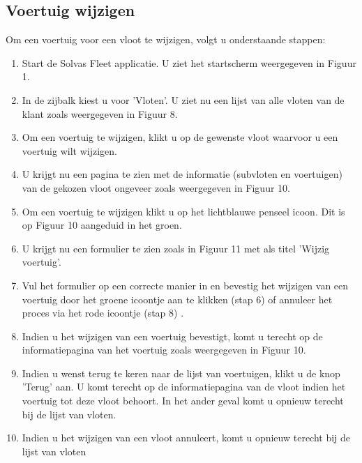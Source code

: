 \documentclass[11pt,openany]{article}
\begin{document}
\subsection{Voertuig wijzigen}
Om een voertuig voor een vloot te wijzigen, volgt u onderstaande stappen:
\begin{enumerate}
	\item Start de Solvas Fleet applicatie. U ziet het startscherm weergegeven in Figuur 1.
	\item In de zijbalk kiest u voor 'Vloten'. U ziet nu een lijst van alle vloten van de klant zoals weergegeven in Figuur 8.
	\item Om een voertuig te wijzigen, klikt u op de gewenste vloot waarvoor u een voertuig wilt wijzigen. 
	\item U krijgt nu een pagina te zien met de informatie (subvloten en voertuigen) van de gekozen vloot
	ongeveer zoals weergegeven in Figuur 10. 
	\item Om een voertuig te wijzigen klikt u op het lichtblauwe penseel icoon. Dit is op Figuur 10 aangeduid in het groen.
	\item U krijgt nu een formulier te zien zoals in Figuur 11 met als titel 'Wijzig voertuig'.
	\item Vul het formulier op een correcte manier in en bevestig het wijzigen van een voertuig door het groene icoontje aan te klikken (stap 6) of annuleer het proces via het rode icoontje (stap 8) .
	\item Indien u het wijzigen van een voertuig bevestigt, komt u terecht op de informatiepagina van het voertuig zoals weergegeven in Figuur 10. 
	\item Indien u wenst terug te keren  naar de lijst van voertuigen, klikt u de knop 'Terug' aan. U komt terecht op de informatiepagina van de vloot indien het voertuig tot deze vloot behoort. In het ander geval komt u opnieuw terecht bij de lijst van vloten.
	\item Indien u het wijzigen van een vloot annuleert, komt u opnieuw terecht bij de lijst van vloten 
\end{enumerate}
\end{document}
